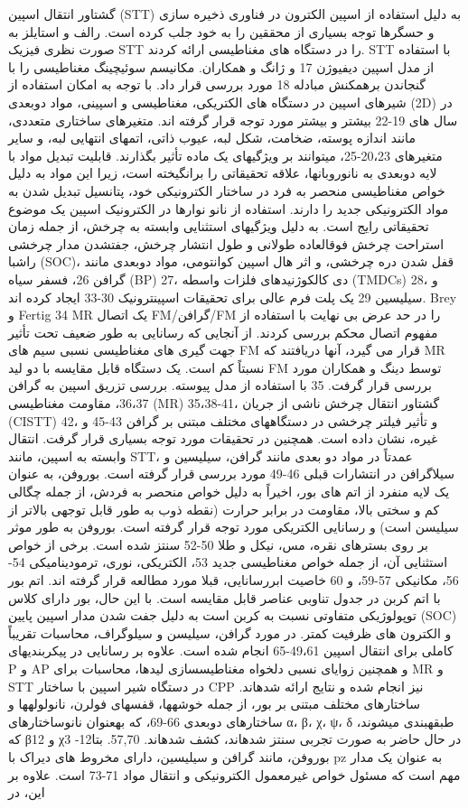 گشتاور انتقال اسپین (STT) به دلیل استفاده از اسپین الکترون در فناوری ذخیره سازی و حسگرها توجه بسیاری از محققین را به خود جلب کرده است. رالف و استایلز به صورت نظری فیزیک STT را در دستگاه های مغناطیسی ارائه کردند. STT با استفاده از مدل اسپین دیفیوژن 17 و ژانگ و همکاران. مکانیسم سوئیچینگ مغناطیسی را با گنجاندن برهمکنش مبادله 18 مورد بررسی قرار داد. با توجه به امکان استفاده از شیرهای اسپین در دستگاه های الکتریکی، مغناطیسی و اسپینی، مواد دوبعدی (2D) در سال های 19-22 بیشتر و بیشتر مورد توجه قرار گرفته اند. متغیرهای ساختاری متعددی، مانند اندازه پوسته، ضخامت، شکل لبه، عیوب ذاتی، اتمهای انتهایی لبه، و سایر متغیرهای 20،23-25، میتوانند بر ویژگیهای یک ماده تأثیر بگذارند. قابلیت تبدیل مواد با لایه دوبعدی به نانوروبانها، علاقه تحقیقاتی را برانگیخته است، زیرا این مواد به دلیل خواص مغناطیسی منحصر به فرد در ساختار الکترونیکی خود، پتانسیل تبدیل شدن به مواد الکترونیکی جدید را دارند. استفاده از نانو نوارها در الکترونیک اسپین یک موضوع تحقیقاتی رایج است. به دلیل ویژگیهای استثنایی وابسته به چرخش، از جمله زمان استراحت چرخش فوقالعاده طولانی و طول انتشار چرخش، جفتشدن مدار چرخشی راشبا (SOC)، قفل شدن دره چرخشی، و اثر هال اسپین کوانتومی، مواد دوبعدی مانند گرافن 26، فسفر سیاه (BP) 27، دی کالکوژنیدهای فلزات واسطه (TMDCs) 28، و سیلیسین 29 یک پلت فرم عالی برای تحقیقات اسپینترونیک 30-33 ایجاد کرده اند. Brey و Fertig 34 MR یک اتصال FM/گرافن/FM را در حد عرض بی نهایت با استفاده از مفهوم اتصال محکم بررسی کردند. از آنجایی که رسانایی به طور ضعیف تحت تأثیر جهت گیری های مغناطیسی نسبی سیم های FM قرار می گیرد، آنها دریافتند که MR نسبتاً کم است. یک دستگاه قابل مقایسه با دو لید FM توسط دینگ و همکاران مورد بررسی قرار گرفت. 35 با استفاده از مدل پیوسته. بررسی تزریق اسپین به گرافن 36،37، مقاومت مغناطیسی (MR) 35،38-41، گشتاور انتقال چرخش ناشی از جریان (CISTT) 42، و تأثیر فیلتر چرخشی در دستگاههای مختلف مبتنی بر گرافن 43-45 و غیره، نشان داده است. همچنین در تحقیقات مورد توجه بسیاری قرار گرفت. انتقال وابسته به اسپین، مانند STT، عمدتاً در مواد دو بعدی مانند گرافن، سیلیسین و سیلاگرافن در انتشارات قبلی 46-49 مورد بررسی قرار گرفته است. بوروفن، به عنوان یک لایه منفرد از اتم های بور، اخیراً به دلیل خواص منحصر به فردش، از جمله چگالی کم و سختی بالا، مقاومت در برابر حرارت (نقطه ذوب به طور قابل توجهی بالاتر از سیلیسن است) و رسانایی الکتریکی مورد توجه قرار گرفته است. بوروفن به طور موثر بر روی بسترهای نقره، مس، نیکل و طلا 50-52 سنتز شده است. برخی از خواص استثنایی آن، از جمله خواص مغناطیسی جدید 53، الکتریکی، نوری، ترمودینامیکی 54-56، مکانیکی 57-59، و 60 خاصیت ابررسانایی، قبلا مورد مطالعه قرار گرفته اند. اتم بور با اتم کربن در جدول تناوبی عناصر قابل مقایسه است. با این حال، بور دارای کلاس توپولوژیکی متفاوتی نسبت به کربن است به دلیل جفت شدن مدار اسپین پایین (SOC) و الکترون های ظرفیت کمتر. در مورد گرافن، سیلیسن و سیلوگراف، محاسبات تقریباً کاملی برای انتقال اسپین 49،61-65 انجام شده است. علاوه بر رسانایی در پیکربندیهای P و AP و همچنین زوایای نسبی دلخواه مغناطیسسازی لیدها، محاسبات برای MR و STT در دستگاه شیر اسپین با ساختار CPP نیز انجام شده و نتایج ارائه شدهاند. ساختارهای مختلف مبتنی بر بور، از جمله خوشهها، قفسهای فولرن، نانولولهها و ساختارهای دوبعدی 66-69، که بهعنوان نانوساختارهای α، β، χ، ψ، δ طبقهبندی میشوند، که β12 و χ3 در حال حاضر به صورت تجربی سنتز شدهاند، کشف شدهاند. 57,70. بتا12-بوروفن، مانند گرافن و سیلیسین، دارای مخروط های دیراک با pz به عنوان یک مدار مهم است که مسئول خواص غیرمعمول الکترونیکی و انتقال مواد 71-73 است. علاوه بر این، در 